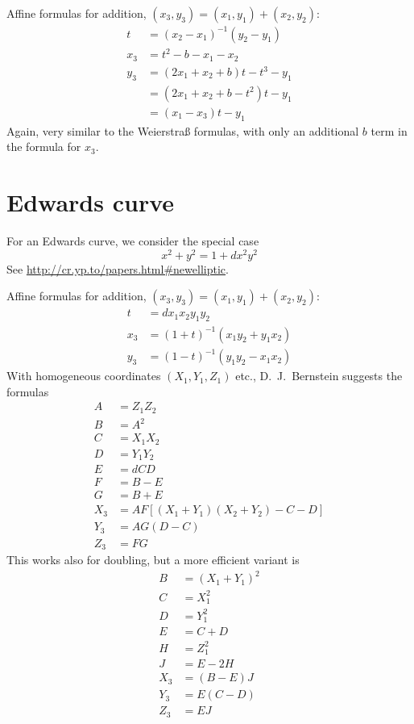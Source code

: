 \documentclass[a4paper]{article}
\begin{document}
Affine formulas for addition, $(x_3, y_3) = (x_1, y_1) + (x_2,
y_2)$:
\begin{align*}
  t &= (x_2 - x_1)^{-1} (y_2 - y_1) \\
  x_3 &= t^2 - b - x_1 - x_2 \\
  y_3 &= (2 x_1 + x_2 + b) t - t^3 - y_1 \\
  &= (2 x_1 + x_2 + b - t^2) t - y_1 \\
  &= (x_1 - x_3) t - y_1
\end{align*}
Again, very similar to the Weierstraß formulas, with only an
additional $b$ term in the formula for $x_3$.

\section{Edwards curve}

For an Edwards curve, we consider the special case
\begin{equation*}
  x^2 + y^2 = 1 + d x^2 y^2
\end{equation*}
See \url{http://cr.yp.to/papers.html#newelliptic}.

Affine formulas for addition, $(x_3, y_3) = (x_1, y_1) + (x_2,
y_2)$:
\begin{align*}
  t &= d x_1 x_2 y_1 y_2 \\
  x_3 &= (1 + t)^{-1} (x_1 y_2 + y_1 x_2) \\
  y_3 &= (1 - t)^{-1} (y_1 y_2 - x_1 x_2)
\end{align*}
With homogeneous coordinates $(X_1, Y_1, Z_1)$ etc., D.~J.~Bernstein
suggests the formulas
\begin{align*}
  A &= Z_1 Z_2 \\
  B &= A^2 \\
  C &= X_1 X_2 \\
  D &= Y_1 Y_2 \\
  E &= d C D \\
  F &= B - E \\
  G &= B + E \\
  X_3 &= A F [(X_1 + Y_1)(X_2 + Y_2) - C - D] \\
  Y_3 &= A G (D - C) \\
  Z_3 &= F G
\end{align*}
This works also for doubling, but a more efficient variant is
\begin{align*}
  B &= (X_1 + Y_1)^2 \\
  C &= X_1^2 \\
  D &= Y_1^2 \\
  E &= C + D \\
  H &= Z_1^2 \\
  J &= E - 2H \\
  X_3 &= (B - E) J \\
  Y_3 &= E (C - D) \\
  Z_3 &= E J
\end{align*}
\end{document}
